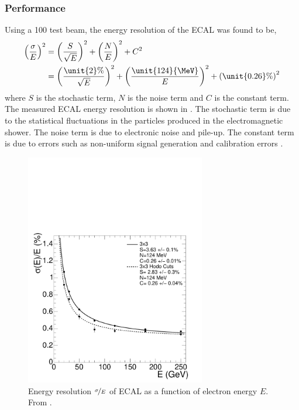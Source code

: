 \subsubsection{Performance}

Using a \unit{100}{\GeV} test beam, the energy resolution of the {ECAL} was
found to be\cite{chatrchyan2008cms},
\begin{align}
\left(\frac{\sigma}{E}\right)^{2} 
&= \left(\frac{S}{\sqrt{E}}\right)^{2} + \left(\frac{N}{E}\right)^{2} + C^{2}\\
&=
\left(\frac{\unit{2}{\%}}{\sqrt{E}}\right)^{2} +
\left(\frac{\unit{124}{\MeV}}{E}\right)^{2} + 
\left(\unit{0.26}{\%}\right)^{2}  
\end{align}
where $S$ is the stochastic term, $N$ is the noise term and $C$ is the constant
term. The measured {ECAL} energy resolution is shown in . The
stochastic term is due to the statistical fluctuations in the particles produced
in the electromagnetic shower. The noise term is due to electronic noise and
pile-up. The constant term is due to errors such as non-uniform signal
generation and calibration errors \cite{chatrchyan2008cms}.

\begin{figure}[htbp]
  \centering
  \includegraphics[width=0.7\textwidth]{ecal_performance}
  \caption[Energy resolution $\nicefrac{\sigma}{E}$ of ECAL as a function of
electron energy $E$]{Energy resolution $\nicefrac{\sigma}{E}$ of ECAL as a
function of \label{fig:ECAL} electron energy $E$. From
\cite{chatrchyan2008cms}.}
\end{figure}

